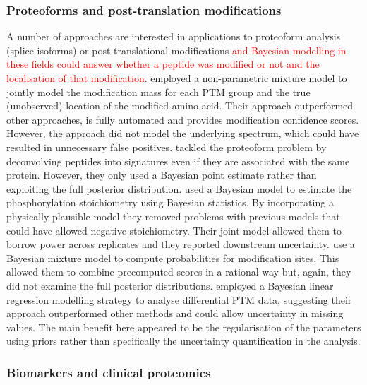 \documentclass[12pt,english, journal=jpr, layout=twocolumn]{article}
\begin{document}
\subsubsection{Proteoforms and post-translation modifications}
A number of approaches are interested in applications to proteoform analysis (splice isoforms) or post-translational modifications \citep{Chung::2013, Webb::2014, Lim::2017, Shteynberg::2019, Mallikarun::2020} \textcolor{red}{and Bayesian modelling in these fields could answer whether a peptide was modified or not and the localisation of that modification}. \citet{Chung::2013} employed a non-parametric mixture model to jointly model the modification mass for each PTM group and the true (unobserved) location of the modified amino acid. Their approach outperformed other approaches, is fully automated and provides modification confidence scores. However, the approach did not model the underlying spectrum, which could have resulted in unnecessary false positives. \citet{Webb::2014} tackled the proteoform problem by deconvolving peptides into signatures even if they are associated with the same protein. However, they only used a Bayesian point estimate rather than exploiting the full posterior distribution. \citet{Lim::2017} used a Bayesian model to estimate the phosphorylation stoichiometry using Bayesian statistics. By incorporating a physically plausible model they removed problems with previous models that could have allowed negative stoichiometry. Their joint model allowed them to borrow power across replicates and they reported downstream uncertainty. \citet{Shteynberg::2019} use a Bayesian mixture model to compute probabilities for modification sites. This allowed them to combine precomputed scores in a rational way but, again, they did not examine the full posterior distributions. \citet{Mallikarun::2020} employed a Bayesian linear regression modelling strategy to analyse differential PTM data, suggesting their approach outperformed other methods and could allow uncertainty in missing values. The main benefit here appeared to be the regularisation of the parameters using priors rather than specifically the uncertainty quantification in the analysis.

\subsubsection{Biomarkers and clinical proteomics}
\end{document}
